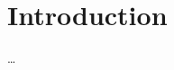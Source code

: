 \documentclass[english,inz,shortabstract]{iithesis}
\author         {Błażej Sowa}
\begin{document}
\chapter{Introduction}
\citep{joseph2015mastering}

\ldots



\end{document}
